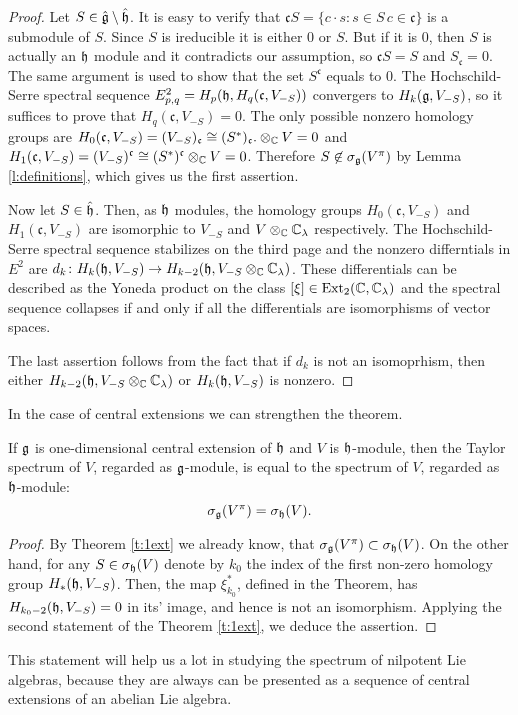 \begin{proof}
    Let $S \in \hat{\mathfrak{g}} \setminus \hat{\mathfrak{h}}$. It is easy to verify that $\mathfrak{c}S=\{c\cdot s
    \colon s \in S\, c \in \mathfrak{c}\}$ is a submodule of $S$. Since $S$ is ireducible it is
    either $0$ or $S$. But if it is $0$, then $S$ is actually an $\mathfrak{h}$ module and it contradicts
    our assumption, so $\mathfrak{c}S = S$ and $S_\mathfrak{c} = 0$. The same argument is used
    to show that the set $S^\mathfrak{c}$ equals to $0$. The Hochschild-Serre spectral sequence
    $E^2_{p, q} = H_p(\mathfrak{h}, H_q(\mathfrak{c}, V_{-S}))$ convergers to $H_k(\mathfrak{g}, V_{-S})$, so it
    suffices to prove that $H_q(\mathfrak{c}, V_{- S})= 0$. The only possible nonzero homology
    groups are $H_0(\mathfrak{c}, V_{-S}) = (V_{-S})_\mathfrak{c} \cong (S^*)_\mathfrak{c}.
    \otimes_{\mathbb{C}} V = 0$ and $H_1(\mathfrak{c}, V_{-S}) = (V_{-S})^\mathfrak{c} \cong
    (S^*)^\mathfrak{c} \otimes_{\mathbb{C}} V = 0$. Therefore $S \not\in \sigma_{\mathfrak{g}}(V^\pi)$ by Lemma
    \ref{l:definitions}, which gives us the first assertion.

    Now let $S \in \hat{\mathfrak{h}}$. Then, as $\mathfrak{h}$ modules, the homology groups $H_0(\mathfrak{c},
    V_{-S})$ and $H_1(\mathfrak{c}, V_{-S})$ are isomorphic to $V_{-S}$ and $V\otimes_{\mathbb{C}}
    \mathbb{C}_\lambda$ respectively. The Hochschild-Serre spectral sequence stabilizes on the third page
    and the nonzero differntials in $E^2$ are $d_k\colon H_k(\mathfrak{h}, V_{-S}) \to H_{k - 2}(\mathfrak{h},
    V_{-S}\otimes_{\mathbb{C}} \mathbb{C}_\lambda)$. These differentials can be described as the Yoneda product on
    the class $[\xi] \in \operatorname{Ext}_2(\mathbb{C}, \mathbb{C}_\lambda)$ and the spectral sequence collapses if and only
    if all the differentials are isomorphisms of vector spaces.

    The last assertion follows from the fact that if $d_k$ is not an isomoprhism, then either
    $H_{k - 2}(\mathfrak{h},  V_{-S}\otimes_{\mathbb{C}} \mathbb{C}_\lambda)$ or $H_k(\mathfrak{h}, V_{-S})$ is nonzero.
\end{proof}
In the case of central extensions we can strengthen the theorem.
\begin{corollary}
    If $\mathfrak{g}$ is one-dimensional central extension of $\mathfrak{h}$ and $V$ is $\mathfrak{h}$-module, then
    the Taylor spectrum of $V$, regarded as $\mathfrak{g}$-module, is equal to the spectrum of $V$,
    regarded as $\mathfrak{h}$-module:
    \[
        \sigma_{\mathfrak{g}}(V^\pi) = \sigma_{\mathfrak{h}}(V).
    \]

\end{corollary}
\begin{proof}
    By Theorem \ref{t:1ext} we already know, that $\sigma_{\mathfrak{g}}(V^\pi) \subset \sigma_{\mathfrak{h}}(V)$. On
    the other hand, for any $S\in \sigma_{\mathfrak{h}}(V)$ denote by $k_0$ the index of the first non-zero
    homology group $H_*(\mathfrak{h}, V_{-S})$. Then, the map $\xi^*_{k_0}$, defined in the Theorem, has
    $H_{k_0 - 2}(\mathfrak{h}, V_{-S}) = 0$ in its' image, and hence is not an isomorphism. Applying the
    second statement of the Theorem \ref{t:1ext}, we deduce the assertion.
\end{proof}
This statement will help us a lot in studying the spectrum of nilpotent Lie algebras, because they are
always can be presented as a sequence of central extensions of an abelian Lie algebra.
